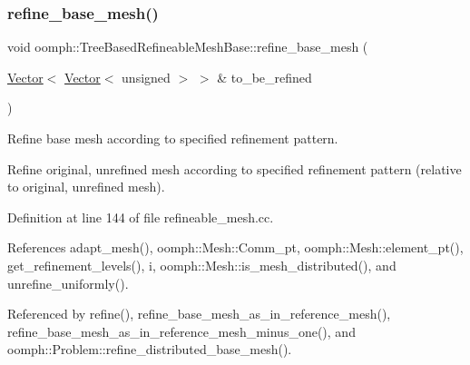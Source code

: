 \mbox{\label{classoomph_1_1TreeBasedRefineableMeshBase_a77c2eb2c650ba34c79cf3b156204ee3b}} 
\subsubsection{\texorpdfstring{refine\+\_\+base\+\_\+mesh()}{refine\_base\_mesh()}}
{\footnotesize\ttfamily void oomph\+::\+Tree\+Based\+Refineable\+Mesh\+Base\+::refine\+\_\+base\+\_\+mesh (\begin{DoxyParamCaption}\item[{\hyperlink{classoomph_1_1Vector}{Vector}$<$ \hyperlink{classoomph_1_1Vector}{Vector}$<$ unsigned $>$ $>$ \&}]{to\+\_\+be\+\_\+refined }\end{DoxyParamCaption})}



Refine base mesh according to specified refinement pattern. 

Refine original, unrefined mesh according to specified refinement pattern (relative to original, unrefined mesh). 

Definition at line 144 of file refineable\+\_\+mesh.\+cc.



References adapt\+\_\+mesh(), oomph\+::\+Mesh\+::\+Comm\+\_\+pt, oomph\+::\+Mesh\+::element\+\_\+pt(), get\+\_\+refinement\+\_\+levels(), i, oomph\+::\+Mesh\+::is\+\_\+mesh\+\_\+distributed(), and unrefine\+\_\+uniformly().



Referenced by refine(), refine\+\_\+base\+\_\+mesh\+\_\+as\+\_\+in\+\_\+reference\+\_\+mesh(), refine\+\_\+base\+\_\+mesh\+\_\+as\+\_\+in\+\_\+reference\+\_\+mesh\+\_\+minus\+\_\+one(), and oomph\+::\+Problem\+::refine\+\_\+distributed\+\_\+base\+\_\+mesh().

\mbox{\label{classoomph_1_1TreeBasedRefineableMeshBase_a6a69f5485eb426f6f60ed5a92db383a3}} 
